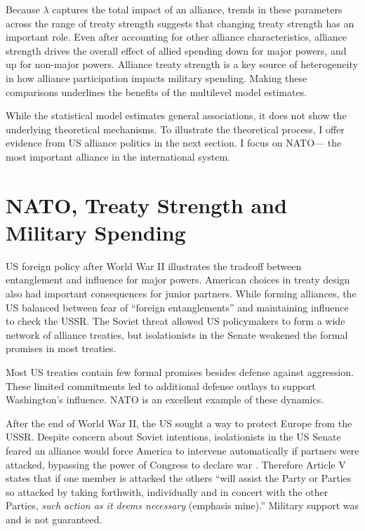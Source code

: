 \documentclass[12pt]{article}
\begin{document}
Because $\lambda$ captures the total impact of an alliance, trends in these parameters across the range of treaty strength suggests that changing treaty strength has an important role. 
Even after accounting for other alliance characteristics, alliance strength drives the overall effect of allied spending down for major powers, and up for non-major powers. 
Alliance treaty strength is a key source of heterogeneity in how alliance participation impacts military spending. 
Making these comparisons underlines the benefits of the multilevel model estimates. 


While the statistical model estimates general associations, it does not show the underlying theoretical mechanisms. 
To illustrate the theoretical process, I offer evidence from US alliance politics in the next section.  
I focus on NATO--- the most important alliance in the international system. 


\section{NATO, Treaty Strength and Military Spending}


US foreign policy after World War II illustrates the tradeoff between entanglement and influence for major powers.
American choices in treaty design also had important consequences for junior partners. 
While forming alliances, the US balanced between fear of ``foreign entanglements'' and maintaining influence to check the USSR.
The Soviet threat allowed US policymakers to form a wide network of alliance treaties, but isolationists in the Senate weakened the formal promises in most treaties. 


Most US treaties contain few formal promises besides defense against aggression. 
These limited commitments led to additional defense outlays to support Washington's influence.  
NATO is an excellent example of these dynamics. 


After the end of World War II, the US sought a way to protect Europe from the USSR. 
Despite concern about Soviet intentions, isolationists in the US Senate feared an alliance would force America to intervene automatically if partners were attacked, bypassing the power of Congress to declare war \citep[pg. 280-1]{Acheson1969}.
Therefore Article V states that if one member is attacked the others ``will assist the Party or Parties so attacked by taking forthwith, individually and in concert with the other Parties, \emph{such action as it deems necessary} (emphasis mine).'' 
Military support was and is not guaranteed. 
\end{document}
